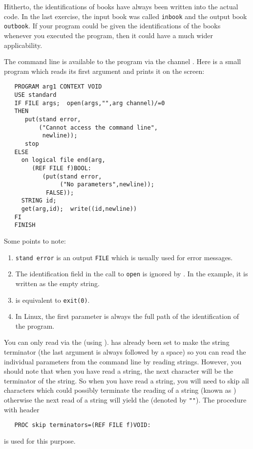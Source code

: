 Hitherto, the identifications of books have always been written into
the actual code. In the last exercise, the input book was called
\verb|inbook| and the output book \verb|outbook|. If your program
could be given the identifications of the books whenever you executed
the program, then it could have a much wider applicability.

The command line is available to the program via the channel
. Here is a small program which reads
its first argument and prints it on the screen:
\begin{verbatim}
   PROGRAM arg1 CONTEXT VOID
   USE standard
   IF FILE args;  open(args,"",arg channel)/=0
   THEN
      put(stand error,
          ("Cannot access the command line",
           newline));
      stop
   ELSE
     on logical file end(arg,
        (REF FILE f)BOOL:
           (put(stand error,
                ("No parameters",newline));
            FALSE));
     STRING id;
     get(arg,id);  write((id,newline))
   FI
   FINISH
\end{verbatim}
\noindent
Some points to note:
\begin{enumerate}
\item \verb|stand error| is an output \verb|FILE| which is usually used
for error messages.
\item The identification field in the call to \verb|open| is ignored
by . In the example, it is written as
the empty string.
\item {} is equivalent to \verb|exit(0)|.
\item In Linux, the first parameter is always the full path of the
identification of the program.
\end{enumerate}
You can only read via the  (using
).  has already been set to make the string
terminator  (the last argument is always followed by a
space) so you can read the individual parameters from the command line
by reading strings.  However, you should note that when you have read a
string, the next character will be the terminator of the string. So
when you have read a string, you will need to skip all characters which
could possibly terminate the reading of a string (known as
) otherwise the next read of a string will yield the
 (denoted by \verb|""|). The procedure  with header
\begin{verbatim}
   PROC skip terminators=(REF FILE f)VOID:
\end{verbatim}
\noindent
is used for this purpose.

